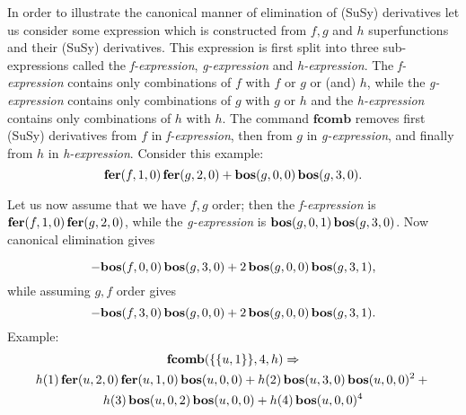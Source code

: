 {In order to illustrate the canonical manner of elimination of (SuSy)
derivatives let us consider some expression which is constructed from
$f, g$ and $h$ superfunctions and their (SuSy) derivatives.  This
expression is first split into three sub-expressions called the
\textit{f-expression}, \textit{g-expression} and
\textit{h-expression}.  The \textit{f-expression} contains only
combinations of $f$ with $f$ or $g$ or (and) $h$, while the
\textit{g-expression} contains only combinations of $g$ with $g$ or
$h$ and the \textit{h-expression} contains only combinations of $h$
with $h$.  The command $\mathbf{fcomb}$ removes first (SuSy)
derivatives from $f$ in \textit{f-expression}, then from $g$ in
\textit{g-expression}, and finally from $h$ in \textit{h-expression}.
Consider this example:
\begin{equation*}
  \mathbf{fer}(f,1,0)\,\mathbf{fer}(g,2,0) + \mathbf{bos}(g,0,0)\,\mathbf{bos}(g,3,0).
\end{equation*}
\begin{sloppypar}
  Let us now assume that we have $f,g$ order; then the
  \textit{f-expression} is $\mathbf{fer}(f,1,0)\,\mathbf{fer}(g,2,0)$, while the
  \textit{g-expression} is $\mathbf{bos}(g,0,1)\,\mathbf{bos}(g,3,0)$.  Now canonical
  elimination gives
\end{sloppypar}
\begin{equation*}
  - \mathbf{bos}(f,0,0)\,\mathbf{bos}(g,3,0) + 2\,\mathbf{bos}(g,0,0)\,\mathbf{bos}(g,3,1),
\end{equation*}
while assuming $g,f$ order gives
\begin{equation*}
  - \mathbf{bos}(f,3,0)\,\mathbf{bos}(g,0,0) + 2\,\mathbf{bos}(g,0,0)\,\mathbf{bos}(g,3,1).
\end{equation*}
Example:
\begin{multline*}
  \mathbf{fcomb}(\{\{u,1\}\},4,h) \Rightarrow \\
  h(1)\,\mathbf{fer}(u,2,0)\,\mathbf{fer}(u,1,0)\,\mathbf{bos}(u,0,0) + h(2)\,\mathbf{bos}(u,3,0)\,\mathbf{bos}(u,0,0)^2 + \mbox{}\\
  h(3)\,\mathbf{bos}(u,0,2)\,\mathbf{bos}(u,0,0) + h(4)\,\mathbf{bos}(u,0,0)^4
\end{multline*}

}

